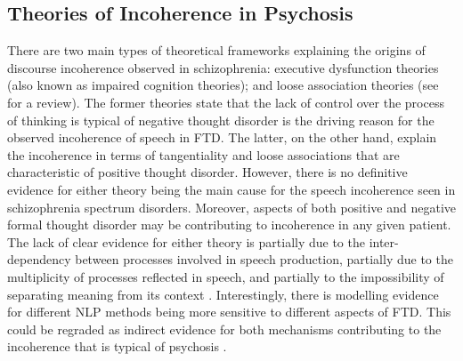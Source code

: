 

\subsection{Theories of Incoherence in Psychosis}

There are two main types of theoretical frameworks explaining the origins of discourse incoherence observed in schizophrenia: executive dysfunction theories (also known as impaired cognition theories); and loose association theories (see \cite{ditman2010building} for a review). The former theories state that the lack of control over the process of thinking is typical of negative thought disorder is the driving reason for the observed incoherence of speech in FTD. The latter, on the other hand, explain the incoherence in terms of tangentiality and loose associations that are characteristic of positive thought disorder. However, there is no definitive evidence for either theory being the main cause for the speech incoherence seen in schizophrenia spectrum disorders. Moreover, aspects of both positive and negative formal thought disorder may be contributing to incoherence in any given patient. The lack of clear evidence for either theory is partially due to the inter-dependency between processes involved in speech production, partially due to the multiplicity of processes reflected in speech, and partially to the impossibility of separating meaning from its context \citep{cohen2017can}. Interestingly, there is modelling evidence for different NLP methods being more sensitive to different aspects of FTD. This could be regraded as indirect evidence for both mechanisms contributing to the incoherence that is typical of psychosis \citep{fradkin2023theory}.



